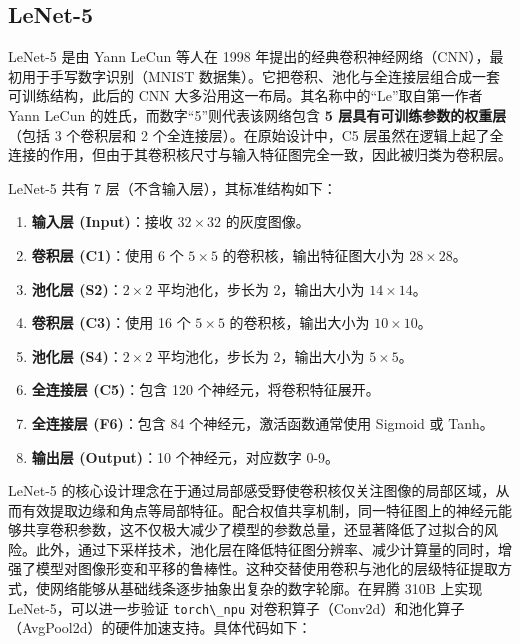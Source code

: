 \subsection{LeNet-5}\label{src-book-chapter3-h14}

LeNet-5 是由 Yann LeCun 等人在 1998
年提出的经典卷积神经网络（CNN），最初用于手写数字识别（MNIST
数据集）。它把卷积、池化与全连接层组合成一套可训练结构，此后的 CNN
大多沿用这一布局。其名称中的``Le''取自第一作者 Yann LeCun
的姓氏，而数字``5''则代表该网络包含 \textbf{5
层具有可训练参数的权重层}（包括 3 个卷积层和 2
个全连接层）。在原始设计中，C5
层虽然在逻辑上起了全连接的作用，但由于其卷积核尺寸与输入特征图完全一致，因此被归类为卷积层。

LeNet-5 共有 7 层（不含输入层），其标准结构如下：

\begin{enumerate}
\def\labelenumi{\arabic{enumi}.}
\tightlist
\item
  \textbf{输入层 (Input)}：接收 \(32 \times 32\) 的灰度图像。
\item
  \textbf{卷积层 (C1)}：使用 6 个 \(5 \times 5\)
  的卷积核，输出特征图大小为 \(28 \times 28\)。
\item
  \textbf{池化层 (S2)}：\(2 \times 2\) 平均池化，步长为 2，输出大小为
  \(14 \times 14\)。
\item
  \textbf{卷积层 (C3)}：使用 16 个 \(5 \times 5\) 的卷积核，输出大小为
  \(10 \times 10\)。
\item
  \textbf{池化层 (S4)}：\(2 \times 2\) 平均池化，步长为 2，输出大小为
  \(5 \times 5\)。
\item
  \textbf{全连接层 (C5)}：包含 120 个神经元，将卷积特征展开。
\item
  \textbf{全连接层 (F6)}：包含 84 个神经元，激活函数通常使用 Sigmoid 或
  Tanh。
\item
  \textbf{输出层 (Output)}：10 个神经元，对应数字 0-9。
\end{enumerate}

LeNet-5
的核心设计理念在于通过局部感受野使卷积核仅关注图像的局部区域，从而有效提取边缘和角点等局部特征。配合权值共享机制，同一特征图上的神经元能够共享卷积参数，这不仅极大减少了模型的参数总量，还显著降低了过拟合的风险。此外，通过下采样技术，池化层在降低特征图分辨率、减少计算量的同时，增强了模型对图像形变和平移的鲁棒性。这种交替使用卷积与池化的层级特征提取方式，使网络能够从基础线条逐步抽象出复杂的数字轮廓。在昇腾
310B 上实现 LeNet-5，可以进一步验证 \passthrough{\lstinline!torch\_npu!}
对卷积算子（Conv2d）和池化算子（AvgPool2d）的硬件加速支持。具体代码如下：

